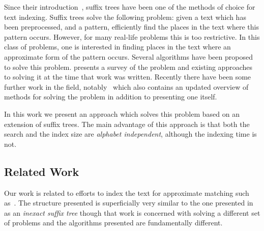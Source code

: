 Since their introduction~\cite{DBLP:conf/focs/Weiner73}, suffix trees have been one of the methods of choice for text indexing. Suffix trees solve the following problem: given a text which has been preprocessed, and a pattern, efficiently find the places in the text where this pattern occurs.  However, for many real-life problems this is too restrictive. In this class of problems, one is interested in finding places in the text where an approximate form of the pattern occurs. Several algorithms have been proposed to solve this problem. \cite{navarro:guided} presents a survey of the problem and existing approaches to solving it at the time that work was written. Recently there have been some further work in the field, notably~\cite{maass:text} which also contains an updated overview of methods for solving the problem in addition to presenting one itself.

In this work we present an approach which solves this problem based on an extension of suffix trees. The main advantage of this approach is that both the search and the index size are \emph{alphabet independent}, although the indexing time is not.

\subsection{Related Work}

Our work is related to efforts to index the text for approximate matching such as~\cite{maass:text,amir00oneerror}. The structure presented is superficially very similar to the one presented in~\cite{DBLP:journals/tcs/ChattarajP05} as an \textit{inexact suffix tree} though that work is concerned with solving a different set of problems and the algorithms presented are fundamentally different.
